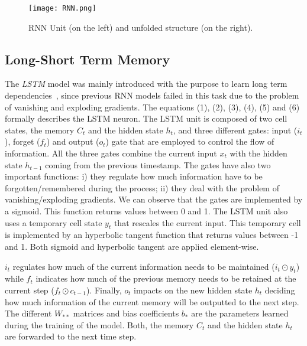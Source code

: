 \documentclass[journal, onecolumn]{IEEEtran}
\begin{document}
\begin{figure}[ht!]
\centering
\texttt{[image: RNN.png]}
\caption{RNN Unit (on the left) and unfolded structure (on the right). \label{fig:RNN}}
\end{figure}
\subsection{Long-Short Term Memory\label{sec:IRF} }


The \textit{LSTM} model was mainly introduced with the purpose to learn long term dependencies~\cite{HochreiterS96}, since previous RNN models failed in this task due to the problem of vanishing and exploding gradients. The equations (1), (2), (3), (4), (5) and (6) formally describes the LSTM neuron. 
The LSTM unit is composed of two cell states, the memory $C_t$ and the hidden state $h_t$, and three different gates:  input ($i_t$), forget ($f_t$) and output ($o_t$) gate that are employed to control the flow of information. All the three gates combine the current input $x_t$ with the hidden state $h_{t-1}$ coming from the previous timestamp.
The gates have also two important functions: i) they regulate how much information have to be forgotten/remembered during the process; ii) they deal with the problem of vanishing/exploding gradients. We can observe that the gates are implemented by a sigmoid. This function returns values between 0 and 1.
The LSTM unit also uses a temporary cell state $y_t$ that rescales the current input. 
This temporary cell is implemented by an hyperbolic tangent function that returns values between -1 and 1. Both sigmoid and hyperbolic tangent are applied element-wise.

$i_t$ regulates how much of the current information needs to be maintained ($i_t \odot y_t$) while $f_t$ indicates how much of the previous memory needs to be retained at the current step ($f_t \odot c_{t-1}$). Finally, $o_t$ impacts on the new hidden state $h_t$ deciding how much information of the current memory will be outputted to the next step. The different $W_{**}$ matrices and bias coefficients $b_{*}$ are the parameters learned during the training of the model. Both, the memory $C_t$ and the hidden state $h_t$ are forwarded to the next time step. 
\end{document}
